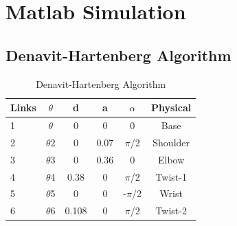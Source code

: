 \documentclass[11pt,a4paper]{report}
\begin{document}
\chapter{Matlab Simulation}
\section{Denavit-Hartenberg Algorithm}
\begin{table}[h]

	\centering
	\begin{tabular}{| l | c c c c c |}
		\hline
		Links 	& $\theta$ 		& d 	& a 	& $\alpha$	& Physical	\\ [0.5ex]
		\hline
		1 		& $\theta$ 		& 0 	& 0 	& 0 		& Base 		\\
		2 		& $\theta$2 	& 0 	& 0.07 	& $\pi$/2 	& Shoulder	\\
		3 		& $\theta$3 	& 0 	& 0.36 	& 0 		& Elbow		\\
		4 		& $\theta$4 	& 0.38 	& 0 	& $\pi$/2 	& Twist-1	\\
		5 		& $\theta$5 	& 0 	& 0 	& -$\pi$/2 	& Wrist		\\
		6 		& $\theta$6 	& 0.108 & 0 	& $\pi$/2 	& Twist-2	\\ [1ex]
		\hline
		
	\end{tabular}
		\caption{Denavit-Hartenberg Algorithm}
\end{table}
\end{document}
